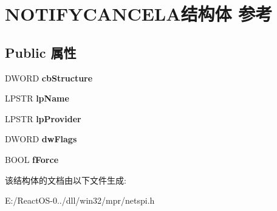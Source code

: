 \hypertarget{struct_n_o_t_i_f_y_c_a_n_c_e_l_a}{}\section{N\+O\+T\+I\+F\+Y\+C\+A\+N\+C\+E\+L\+A结构体 参考}
\label{struct_n_o_t_i_f_y_c_a_n_c_e_l_a}
\subsection*{Public 属性}
\begin{DoxyCompactItemize}
\item 
\mbox{\label{struct_n_o_t_i_f_y_c_a_n_c_e_l_a_ac9fc5546342b50847f1d13bcd2fd28c0}} 
D\+W\+O\+RD {\bfseries cb\+Structure}
\item 
\mbox{\label{struct_n_o_t_i_f_y_c_a_n_c_e_l_a_aabbf5d22cdc91016a0ccdf09454a1c15}} 
L\+P\+S\+TR {\bfseries lp\+Name}
\item 
\mbox{\label{struct_n_o_t_i_f_y_c_a_n_c_e_l_a_a23c737676e4ab759c4ab3be16d31100c}} 
L\+P\+S\+TR {\bfseries lp\+Provider}
\item 
\mbox{\label{struct_n_o_t_i_f_y_c_a_n_c_e_l_a_a82930bbe461712beaf217359fb2c92f0}} 
D\+W\+O\+RD {\bfseries dw\+Flags}
\item 
\mbox{\label{struct_n_o_t_i_f_y_c_a_n_c_e_l_a_a3aa81c87607e329a9a4731010a569d41}} 
B\+O\+OL {\bfseries f\+Force}
\end{DoxyCompactItemize}


该结构体的文档由以下文件生成\+:\begin{DoxyCompactItemize}
\item 
E\+:/\+React\+O\+S-\/0../dll/win32/mpr/netspi.\+h\end{DoxyCompactItemize}
